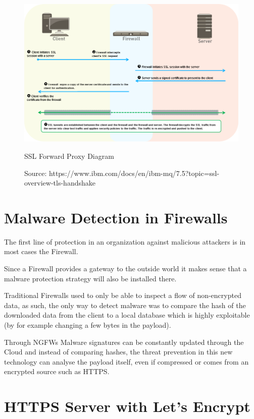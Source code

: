 \documentclass[status=normal,cover=tesi,language=en]{gmeepd}
\begin{document}
\begin{figure}[!hb]
 \centering
 \includegraphics[width=13cm]{img/ssl_decryption_diagram.png}
 \caption{SSL Forward Proxy Diagram}
 \caption*{Source: https://www.ibm.com/docs/en/ibm-mq/7.5?topic=ssl-overview-tls-handshake}
 \label{SSL Forward Diagram}
\end{figure}

\pagebreak

\section{Malware Detection in Firewalls}

The first line of protection in an organization against malicious attackers is in most cases the Firewall.

Since a Firewall provides a gateway to the outside world it makes sense that a malware protection strategy will also be installed there.

Traditional Firewalls used to only be able to inspect a flow of non-encrypted data, as such, the only way to detect malware was to compare the hash of the downloaded data from the client to a local database which is highly exploitable (by for example changing a few bytes in the payload).

Through NGFWs Malware signatures can be constantly updated through the Cloud and instead of comparing hashes, the threat prevention in this new technology can analyse the payload itself, even if compressed or comes from an encrypted source such as HTTPS.

\section{HTTPS Server with Let's Encrypt}
\end{document}

